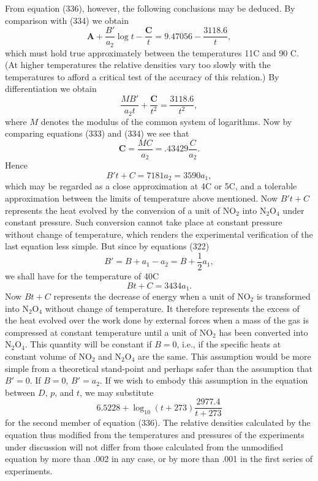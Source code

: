 \documentclass[12pt]{article}
\begin{document}
From equation (336), however, the following conclusions may be
deduced. By comparison with (334) we obtain
$$ \mathbf{A} +\frac{B'}{a_2} \log t  -\frac{\mathbf{C}}{t}=  9.47056- \frac{3118.6}{t}, $$
which must hold true approximately between the temperatures 11\degree C and 90 \degree C. (At higher temperatures the relative densities vary too slowly with the temperatures to afford a critical test of the accuracy of this relation.) By differentiation we obtain
$$\frac{MB'}{a_2 t} +\frac{\mathbf{C}}{t^2} = \frac{3118.6}{t^2}, $$
where $M$ denotes the modulus of the common system of logarithms. Now by comparing equations (333) and (334) we see that
$$\mathbf{C} = \frac{MC}{a_2} = .43429 \frac{C}{a_2}.$$
Hence        
$$  B't + C= 7181 a_2= 3590a_1,$$
which may be regarded as a close approximation at 4\degree C or 5\degree C, and a tolerable approximation between the limits of temperature above mentioned.  Now $B't+C$ represents the heat evolved by the conversion of a unit of NO$_2$ into N$_2$O$_4$ under constant pressure. Such conversion cannot take place at constant pressure without change of temperature, which renders the experimental verification of the last equation less simple. But since by equations (322)
$$B' =B+a_1-a_2=B+ \frac{1}{2}a_1,$$
we shall have for the temperature of 40\degree C
$$Bt + C= 3434a_1.$$
Now $Bt+ C$ represents the decrease of energy when a unit of NO$_2$ is transformed into N$_2$O$_4$ without change of temperature. It therefore represents the excess of the heat evolved over the work done by external forces when a mass of the gas is compressed at constant temperature until a unit of NO$_2$ has been converted into N$_2$O$_4$. This quantity will be constant if $B=0$, i.e., if the specific heats at constant volume of NO$_2$ and N$_2$O$_4$ are the same. This assumption would be more simple from a theoretical stand-point and perhaps safer than the assumption that $B'=0$. If $B=0$, $B'=a_2$. If we wish to embody this assumption in the equation between $D$, $p$, and $t$, we may substitute
$$6.5228 + \log_{10}(t + 273) \frac{ 2977.4}{t + 273}$$
for the second member of equation (336).  The relative densities calculated by the equation thus modified from the temperatures and pressures of the experiments under discussion will not differ from those calculated from the unmodified equation by more than .002 in any case, or by more than .001 in the first series of experiments.
\end{document}
